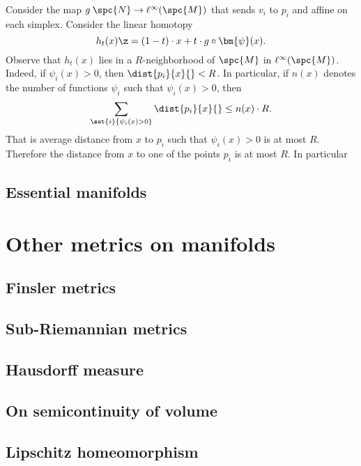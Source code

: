 Consider the map $g\:\spc{N}\to\ell^\infty(\spc{M})$ that sends $v_i$ to $p_i$ and affine on each simplex.
Consider the linear homotopy \[h_t(x)\z=(1-t)\cdot x+ t\cdot g\circ \bm{\psi}(x).\]
Observe that $h_t(x)$ lies in a $R$-neighborhood of $\spc{M}$ in $\ell^\infty(\spc{M})$.
Indeed, if $\psi_i(x)>0$, then $\dist{p_i}{x}{}<R$.
In particular, if $n(x)$ denotes the number of functions $\psi_i$ such that $\psi_i(x)>0$, then  
\[\sum_{\set{i}{\psi_i(x)>0}} \dist{p_i}{x}{}\le n(x)\cdot R.\]
That is average distance from $x$ to $p_i$ such that  $\psi_i(x)>0$ is at most $R$.
Therefore the distance from $x$ to one of the points $p_i$ is at most $R$.
In particular 
\qeds


















\section{Essential manifolds}




\chapter{Other metrics on manifolds}

\section{Finsler metrics}

\section{Sub-Riemannian metrics}

\section{Hausdorff measure}

\section{On semicontinuity of volume}

\section{Lipschitz homeomorphism}




















